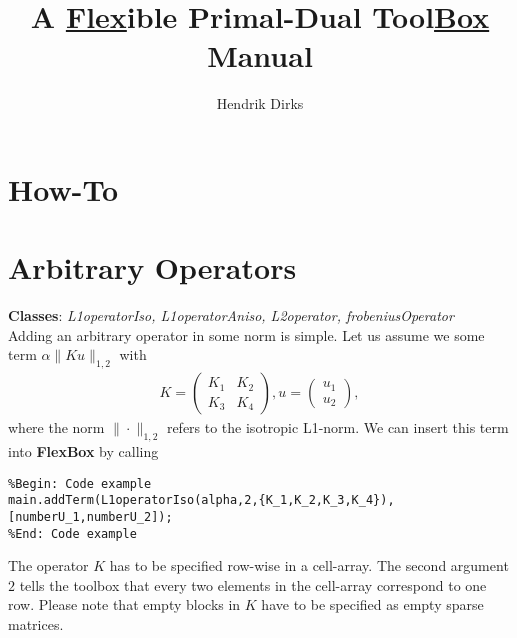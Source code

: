 \documentclass[final,leqno,onefignum,onetabnum]{article}
\title{A \textbf{\underline{Flex}}ible Primal-Dual Tool\textbf{\underline{Box}} \\\large Manual}
\author{Hendrik Dirks}
\newcommand{\1}[1]{\mathds{1}_{#1}}
\begin{document}
	
\maketitle


\section{How-To}

\section{Arbitrary Operators}
\textbf{Classes}: \textit{L1operatorIso, L1operatorAniso, L2operator, frobeniusOperator}\\
Adding an arbitrary operator in some norm is simple. Let us assume we some term $\alpha \|Ku\|_{1,2}$ with 
\begin{align*}
	K=\begin{pmatrix}K_1&K_2\\K_3&K_4\end{pmatrix}, u=\begin{pmatrix}u_1\\u_2\end{pmatrix},
\end{align*}
where the norm $\|\cdot\|_{1,2}$ refers to the isotropic L1-norm. We can insert this term into \textbf{FlexBox} by calling
\begin{lstlisting} 
%Begin: Code example
main.addTerm(L1operatorIso(alpha,2,{K_1,K_2,K_3,K_4}),[numberU_1,numberU_2]);
%End: Code example
\end{lstlisting}
The operator $K$ has to be specified row-wise in a cell-array. The second argument $2$ tells the toolbox that every two elements in the cell-array correspond to one row. Please note that empty blocks in $K$ have to be specified as empty sparse matrices.


	
\listoftodos

%
%
	
\end{document}
